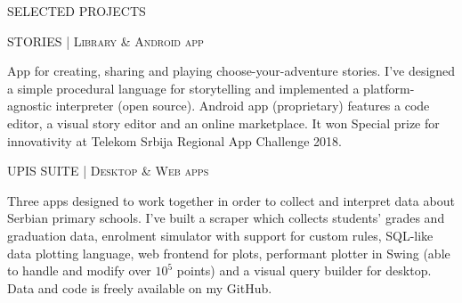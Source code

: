 \begin{minipage}[t]{\linewidth}
{\titleFont\light SELECTED PROJECTS}\newline

\vspace{\titleBottomMargin}
{\subtitleFont\bold STORIES \extraLight\scshape| Library \& Android app \href{https://github.com/luka-j/stories}{\faGithub} \href{https://play.google.com/store/apps/details?id=rs.lukaj.android.stories}{\faAndroid}}\newline%

\vspace{\ribbonTopMargin}
\ribbonJava \ribbonAndroid \ribbonPlay \ribbonPostgres\newline
\vspace{\ribbonBottomMargin}

{\contentFont App for creating, sharing and playing choose-your-adventure stories. I’ve designed a simple procedural language for storytelling and implemented a platform-agnostic interpreter (open source). Android app (proprietary) features a code editor, a visual story editor and an online marketplace. It won Special prize for innovativity at Telekom Srbija Regional App Challenge 2018.}
\end{minipage}\newline%
%
\begin{minipage}[t]{\linewidth}\vspace{\subsectionSpace}
{\subtitleFont\bold UPIS SUITE \extraLight\scshape| Desktop \& Web apps \href{https://github.com/luka-j/UpisScraper}{\faGithub} \href{https://github.com/luka-j/UpisStats}{\faGithub} \href{https://github.com/luka-j/UpisDesktop}{\faGithub}}\newline

\vspace{\ribbonTopMargin}
\ribbonJava \ribbonPlay \ribbonSwing \ribbonPostgres \ribbonJavascript\newline
\vspace{\ribbonBottomMargin}

{\contentFont Three apps designed to work together in order to collect and interpret data about Serbian primary schools. I've built a scraper which collects students’ grades and graduation data, enrolment simulator with support for custom rules, SQL-like data plotting language, web frontend for plots, performant plotter in Swing (able to handle and modify over $10^5$ points) and a visual query builder for desktop. Data and code is freely available on my GitHub.}
\end{minipage}\newline%
